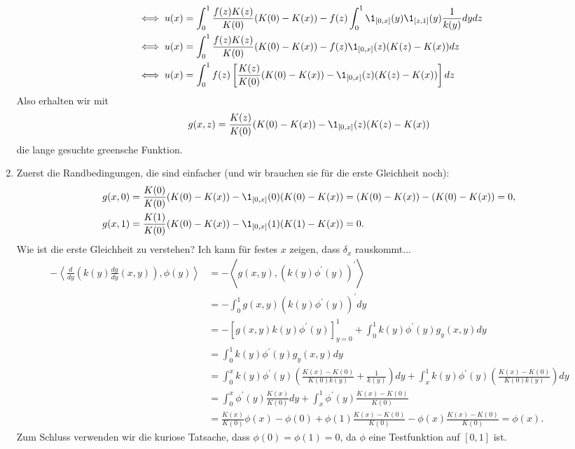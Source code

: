 \begin{solution}
\begin{enumerate}[label = (\roman*)]
\begin{align*}
    &\iff u(x) = \int_0^1\frac{f(z)K(z)}{K(0)}(K(0) - K(x)) - f(z)\int_0^1\1_{[0,x]}(y) \1_{[z,1]}(y) \frac{1}{k(y)}dy dz\\
    &\iff u(x) = \int_0^1\frac{f(z)K(z)}{K(0)}(K(0) - K(x)) - f(z)\1_{[0,x]}(z)(K(z) - K(x)) dz\\
    &\iff u(x) = \int_0^1f(z)\left[\frac{K(z)}{K(0)}(K(0) - K(x)) - \1_{[0,x]}(z)(K(z) - K(x))\right] dz\\
  \end{align*}
  Also erhalten wir mit
  \begin{align*}
    g(x,z) = \frac{K(z)}{K(0)}(K(0) - K(x)) - \1_{[0,x]}(z)(K(z) - K(x))
  \end{align*}
  die lange gesuchte greensche Funktion.
  \item Zuerst die Randbedingungen, die sind einfacher (und wir brauchen sie für die erste Gleichheit noch):
  \begin{align*}
    g(x,0) &= \frac{K(0)}{K(0)}(K(0) - K(x)) - \1_{[0,x]}(0)(K(0) - K(x))
    = (K(0) - K(x)) - (K(0) - K(x)) = 0,\\
    g(x,1) &= \frac{K(1)}{K(0)}(K(0) - K(x)) - \1_{[0,x]}(1)(K(1) - K(x)) = 0.
  \end{align*}
  Wie ist die erste Gleichheit zu verstehen? Ich kann für festes $x$
  zeigen, dass $\delta_x$ rauskommt...
  \begin{align*}
    -\left\langle\frac{d}{dy}\left(k(y)\frac{dg}{dy}(x,y)\right), \phi(y) \right\rangle &=
    -\left\langle g(x,y), (k(y)\phi^{\prime}(y))^{\prime} \right\rangle \\
    &= -\int_0^1 g(x,y)(k(y)\phi^{\prime}(y))^{\prime} dy \\
    &= -[g(x,y)k(y)\phi^{\prime}(y)]_{y=0}^1 + \int_0^1k(y)\phi^{\prime}(y)g_y(x,y)dy \\
    &= \int_0^1k(y)\phi^{\prime}(y)g_y(x,y)dy \\
    &= \int_0^xk(y)\phi^{\prime}(y)\left(\frac{K(x) - K(0)}{K(0)k(y)} + \frac{1}{k(y)}\right)dy
    + \int_x^1k(y)\phi^{\prime}(y)\left(\frac{K(x) - K(0)}{K(0)k(y)}\right)dy\\
    &= \int_0^x\phi^{\prime}(y)\frac{K(x)}{K(0)}dy + \int_x^1\phi^{\prime}(y)\frac{K(x) - K(0)}{K(0)} \\
    &= \frac{K(x)}{K(0)}\phi(x) - \phi(0) + \phi(1)\frac{K(x) - K(0)}{K(0)} - \phi(x)\frac{K(x) - K(0)}{K(0)}= \phi(x).
  \end{align*}
  Zum Schluss verwenden wir die kuriose Tatsache, dass $\phi(0) = \phi(1) = 0$,
  da $\phi$ eine Testfunktion auf $[0,1]$ ist.
\end{enumerate}

\end{solution}

